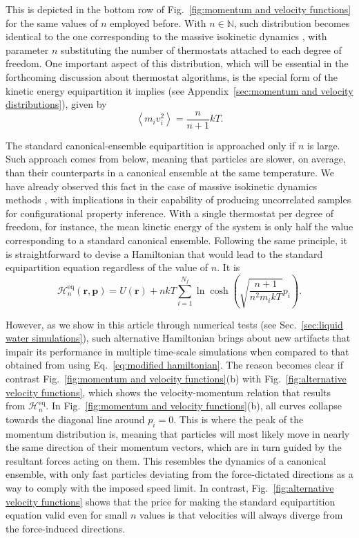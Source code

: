 \documentclass[
aip,
jcp,
reprint,
]{revtex4-1}
\newcommand{\vt}[1]{\boldsymbol{\mathbf{#1}}}          %
\newcommand{\nn}{n}
\begin{document}
This is depicted in the bottom row of Fig.~\ref{fig:momentum and velocity functions} for the same values of $\nn$ employed before.
With $\nn \in \mathbb{N}$, such distribution becomes identical to the one corresponding to the massive isokinetic dynamics \cite{Abreu_2020}, with parameter $\nn$ substituting the number of thermostats attached to each degree of freedom.
One important aspect of this distribution, which will be essential in the forthcoming discussion about thermostat algorithms, is the special form of the kinetic energy equipartition it implies (see Appendix~\ref{sec:momentum and velocity distributions}), given by
\begin{equation}
\label{eq:special kinetic energy equipartition}
\left\langle m_i v_i^2 \right\rangle = \frac{\nn}{\nn+1} kT.
\end{equation}

The standard canonical-ensemble equipartition is approached only if $\nn$ is large.
Such approach comes from below, meaning that particles are slower, on average, than their counterparts in a canonical ensemble at the same temperature.
We have already observed this fact in the case of massive isokinetic dynamics methods \cite{Abreu_2020}, with implications in their capability of producing uncorrelated samples for configurational property inference.
With a single thermostat per degree of freedom, for instance, the mean kinetic energy of the system is only half the value corresponding to a standard canonical ensemble.
Following the same principle, it is straightforward to devise a Hamiltonian that would lead to the standard equipartition equation regardless of the value of $\nn$.
It is
\begin{equation*}
\mathcal{H}^\mathrm{eq}_\nn(\vt r, \vt p) = U(\vt r) + \nn kT \sum_{i=1}^{N_f} \ln \cosh\left(\sqrt{\frac{\nn+1}{\nn^2 m_i k T}} p_i\right).
\end{equation*}

However, as we show in this article through numerical tests (see Sec.~\ref{sec:liquid water simulations}), such alternative Hamiltonian brings about new artifacts that impair its performance in multiple time-scale simulations when compared to that obtained from using Eq.~\eqref{eq:modified hamiltonian}.
The reason becomes clear if contrast Fig.~\ref{fig:momentum and velocity functions}(b) with Fig.~\ref{fig:alternative velocity functions}, which shows the velocity-momentum relation that results from $\mathcal{H}^\mathrm{eq}_\nn$.
In Fig.~\ref{fig:momentum and velocity functions}(b), all curves collapse towards the diagonal line around $p_i = 0$.
This is where the peak of the momentum distribution is, meaning that particles will most likely move in nearly the same direction of their momentum vectors, which are in turn guided by the resultant forces acting on them.
This resembles the dynamics of a canonical ensemble, with only fast particles deviating from the force-dictated directions as a way to comply with the imposed speed limit.
In contrast, Fig.~\ref{fig:alternative velocity functions} shows that the price for making the standard equipartition equation valid even for small $\nn$ values is that velocities will always diverge from the force-induced directions.
\end{document}
